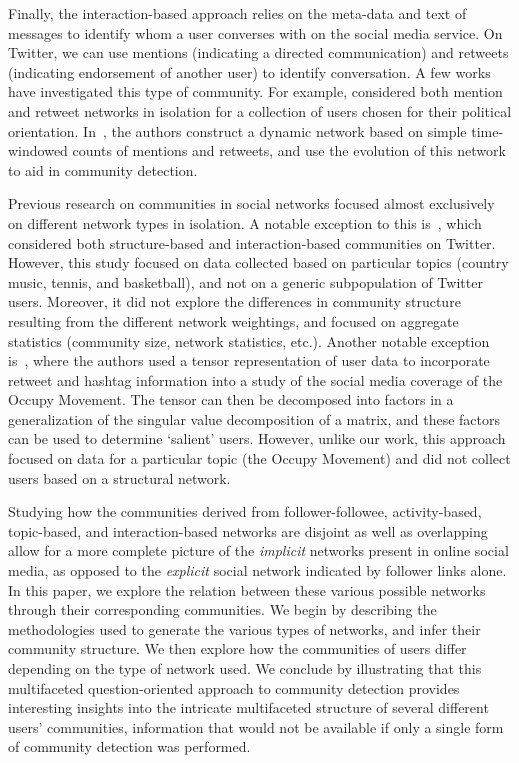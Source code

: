 \documentclass[10pt,letterpaper]{article}
\begin{document}
Finally, the interaction-based approach relies on the meta-data and text of messages to identify whom a user converses with on the social media service. On Twitter, we can use mentions (indicating a directed communication) and retweets (indicating endorsement of another user) to identify conversation. 
A few works have investigated this type of community. For example, \cite{conover2011political} considered both mention and retweet networks in isolation for a collection of users chosen for their political orientation. In~\cite{deitrick2013mutually}, the authors construct a dynamic network based on simple time-windowed counts of mentions and retweets, and use the evolution of this network to aid in community detection.

Previous research on communities in social networks focused almost exclusively on different network types in isolation.
A notable exception to this is~\cite{lim2012tweets}, which considered both structure-based and interaction-based communities on Twitter. However, this study focused on data collected based on particular topics (country music, tennis, and basketball), and not on a generic subpopulation of Twitter users. Moreover, it did not explore the differences in community structure resulting from the different network weightings, and focused on aggregate statistics (community size, network statistics, etc.). Another notable exception is~\cite{kao2013talison}, where the authors used a tensor representation of user data to incorporate retweet and hashtag information into a study of the social media coverage of the Occupy Movement. The tensor can then be decomposed into factors in a generalization of the singular value decomposition of a matrix, and these factors can be used to determine `salient' users. However, unlike our work, this approach focused on data for a particular topic (the Occupy Movement) and did not collect users based on a structural network.

Studying how the communities derived from follower-followee, activity-based, topic-based, and interaction-based networks are disjoint as well as overlapping allow for a more complete picture of the \emph{implicit} networks present in online social media, as opposed to the \emph{explicit} social network indicated by follower links alone. In this paper, we explore the relation between these various possible networks through their corresponding communities. We begin by describing the methodologies used to generate the various types of networks, and infer their community structure.  We then explore how the communities of users differ depending on the type of network used.
We conclude by illustrating that this multifaceted question-oriented approach to community detection provides interesting insights into the intricate multifaceted structure of several different users' communities, information that would not be available if only a single form of community detection was performed. 
\end{document}
